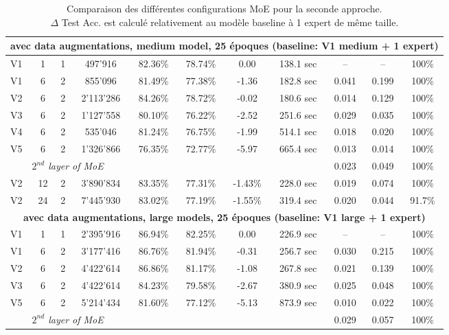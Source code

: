 \documentclass{article}
\begin{document}
\begin{table}[t]
\begin{tabular*}{\textwidth}{@{\extracolsep{\fill}} | l c c c | c c c c | c c | c |}
\multicolumn{11}{|c|}{\textbf{avec data augmentations, medium model, 25 époques (baseline: V1 medium + 1 expert)}} \\
\hline
V1 & 1 & 1 &   497'916 & 82.36\% & 78.74\% &  0.00 & 138.1 sec & --    & --    & 100\% \\
V1 & 6 & 2 &   855'096 & 81.49\% & 77.38\% & -1.36 & 182.8 sec & 0.041 & 0.199 & 100\% \\
V2 & 6 & 2 & 2'113'286 & 84.26\% & 78.72\% & -0.02 & 180.6 sec & 0.014 & 0.129 & 100\% \\
V3 & 6 & 2 & 1'127'558 & 80.10\% & 76.22\% & -2.52 & 251.6 sec & 0.029 & 0.035 & 100\% \\
V4 & 6 & 2 &   535'046 & 81.24\% & 76.75\% & -1.99 & 514.1 sec & 0.018 & 0.020 & 100\% \\
V5 & 6 & 2 & 1'326'866 & 76.35\% & 72.77\% & -5.97 & 665.4 sec & 0.013 & 0.014 & 100\% \\
\multicolumn{4}{|c|}{\textit{$2^{nd}$ layer of MoE}} &&&&&       0.023 & 0.049 & 100\% \\
\hline
V2 & 12 & 2 & 3'890'834 & 83.35\% & 77.31\% & -1.43\% & 228.0 sec & 0.019 & 0.074 & 100\% \\
V2 & 24 & 2 & 7'445'930 & 83.02\% & 77.19\% & -1.55\% & 319.4 sec & 0.020 & 0.044 & 91.7\% \\
\hline

\multicolumn{11}{|c|}{\textbf{avec data augmentations, large models, 25 époques (baseline: V1 large + 1 expert)}} \\
\hline
V1 & 1 & 1 & 2'395'916 & 86.94\% & 82.25\% &  0.00 & 226.9 sec & --    & --    & 100\% \\
V1 & 6 & 2 & 3'177'416 & 86.76\% & 81.94\% & -0.31 & 256.7 sec & 0.030 & 0.215 & 100\% \\
V2 & 6 & 2 & 4'422'614 & 86.86\% & 81.17\% & -1.08 & 267.8 sec & 0.021 & 0.139 & 100\% \\
V3 & 6 & 2 & 4'422'614 & 84.23\% & 79.58\% & -2.67 & 380.9 sec & 0.025 & 0.048 & 100\% \\
V5 & 6 & 2 & 5'214'434 & 81.60\% & 77.12\% & -5.13 & 873.9 sec & 0.010 & 0.022 & 100\% \\
\multicolumn{4}{|c|}{\textit{$2^{nd}$ layer of MoE}} &&&&&     0.029 & 0.057 & 100\% \\
\hline
\end{tabular*}

\caption{Comparaison des différentes configurations MoE pour la seconde approche.\\
$\Delta$ Test Acc. est calculé relativement au modèle baseline à 1 expert de même taille.}
\label{tab:moe_paper2_comparison_cifar10}
\end{table}
\end{document}
